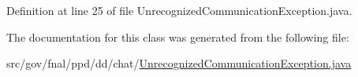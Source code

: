 Definition at line 25 of file Unrecognized\-Communication\-Exception.\-java.



The documentation for this class was generated from the following file\-:\begin{DoxyCompactItemize}
\item 
src/gov/fnal/ppd/dd/chat/\hyperlink{UnrecognizedCommunicationException_8java}{Unrecognized\-Communication\-Exception.\-java}\end{DoxyCompactItemize}
